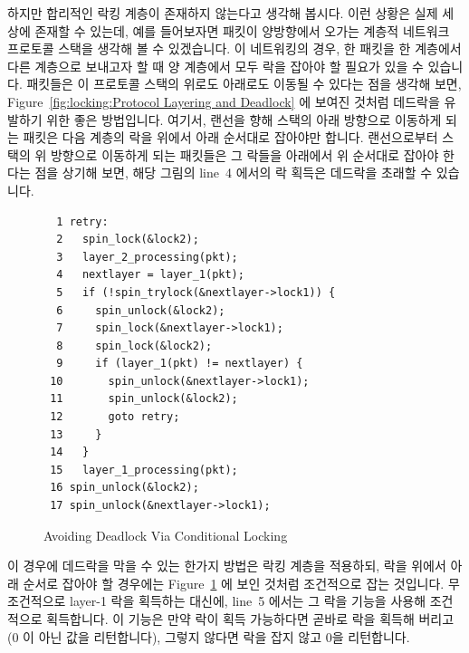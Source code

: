 하지만 합리적인 락킹 계층이 존재하지 않는다고 생각해 봅시다.
이런 상황은 실제 세상에 존재할 수 있는데, 예를 들어보자면 패킷이 양방향에서
오가는 계층적 네트워크 프로토콜 스택을 생각해 볼 수 있겠습니다.
이 네트워킹의 경우, 한 패킷을 한 계층에서 다른 계층으로 보내고자 할 때 양
계층에서 모두 락을 잡아야 할 필요가 있을 수 있습니다.
패킷들은 이 프로토콜 스택의 위로도 아래로도 이동될 수 있다는 점을 생각해 보면, 
Figure~\ref{fig:locking:Protocol Layering and Deadlock} 에 보여진 것처럼
데드락을 유발하기 위한 좋은 방법입니다.
여기서, 랜선을 향해 스택의 아래 방향으로 이동하게 되는 패킷은 다음 계층의 락을
위에서 아래 순서대로 잡아야만 합니다.
랜선으로부터 스택의 위 방향으로 이동하게 되는 패킷들은 그 락들을 아래에서 위
순서대로 잡아야 한다는 점을 상기해 보면, 해당 그림의 line~4 에서의 락 획득은
데드락을 초래할 수 있습니다.

\begin{figure}[tbp]
{ \scriptsize
\begin{verbatim}
  1 retry:
  2   spin_lock(&lock2);
  3   layer_2_processing(pkt);
  4   nextlayer = layer_1(pkt);
  5   if (!spin_trylock(&nextlayer->lock1)) {
  6     spin_unlock(&lock2);
  7     spin_lock(&nextlayer->lock1);
  8     spin_lock(&lock2);
  9     if (layer_1(pkt) != nextlayer) {
 10       spin_unlock(&nextlayer->lock1);
 11       spin_unlock(&lock2);
 12       goto retry;
 13     }
 14   }
 15   layer_1_processing(pkt);
 16 spin_unlock(&lock2);
 17 spin_unlock(&nextlayer->lock1);
\end{verbatim}
}
\caption{Avoiding Deadlock Via Conditional Locking}
\label{fig:locking:Avoiding Deadlock Via Conditional Locking}
\end{figure}

이 경우에 데드락을 막을 수 있는 한가지 방법은 락킹 계층을 적용하되, 락을 위에서
아래 순서로 잡아야 할 경우에는 
Figure~\ref{fig:locking:Avoiding Deadlock Via Conditional Locking} 에 보인
것처럼 조건적으로 잡는 것입니다.
무조건적으로 layer-1 락을 획득하는 대신에, line~5 에서는 그 락을
 기능을 사용해 조건적으로 획득합니다.
이 기능은 만약 락이 획득 가능하다면 곧바로 락을 획득해 버리고 (0 이 아닌 값을
리턴합니다), 그렇지 않다면 락을 잡지 않고 0을 리턴합니다.
\iffalse


